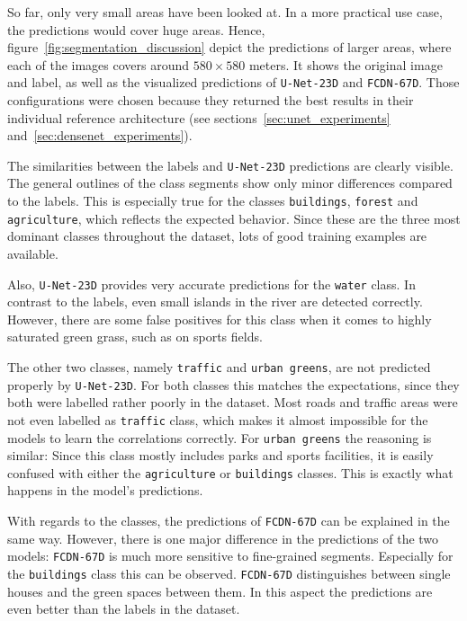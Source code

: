 So far, only very small areas have been looked at. In a more practical use case, the predictions would cover huge areas. Hence, figure~\ref{fig:segmentation_discussion} depict the predictions of larger areas, where each of the images covers around $580\times 580$ meters. It shows the original image and label, as well as the visualized predictions of \texttt{U-Net-23D} and \texttt{FCDN-67D}. Those configurations were chosen because they returned the best results in their individual reference architecture (see sections~\ref{sec:unet_experiments} and~\ref{sec:densenet_experiments}).

The similarities between the labels and \texttt{U-Net-23D} predictions are clearly visible. The general outlines of the class segments show only minor differences compared to the labels. This is especially true for the classes \texttt{buildings}, \texttt{forest} and \texttt{agriculture}, which reflects the expected behavior. Since these are the three most dominant classes throughout the dataset, lots of good training examples are available.

Also, \texttt{U-Net-23D} provides very accurate predictions for the \texttt{water} class. In contrast to the labels, even small islands in the river are detected correctly. However, there are some false positives for this class when it comes to highly saturated green grass, such as on sports fields.

The other two classes, namely \texttt{traffic} and \texttt{urban greens}, are not predicted properly by \texttt{U-Net-23D}. For both classes this matches the expectations, since they both were labelled rather poorly in the dataset. Most roads and traffic areas were not even labelled as \texttt{traffic} class, which makes it almost impossible for the models to learn the correlations correctly. For \texttt{urban greens} the reasoning is similar: Since this class mostly includes parks and sports facilities, it is easily confused with either the \texttt{agriculture} or \texttt{buildings} classes. This is exactly what happens in the model's predictions.

With regards to the classes, the predictions of \texttt{FCDN-67D} can be explained in the same way. However, there is one major difference in the predictions of the two models: \texttt{FCDN-67D} is much more sensitive to fine-grained segments. Especially for the \texttt{buildings} class this can be observed. \texttt{FCDN-67D} distinguishes between single houses and the green spaces between them. In this aspect the predictions are even better than the labels in the dataset.

